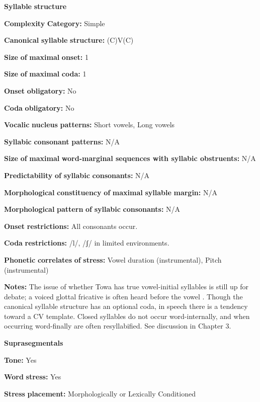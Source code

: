 \textbf{Syllable} \textbf{structure}

\textbf{Complexity} \textbf{Category:} Simple

\textbf{Canonical} \textbf{syllable} \textbf{structure:} (C)V(C) \citep[21-22]{Yumitani1998}

\textbf{Size} \textbf{of} \textbf{maximal} \textbf{onset:} 1

\textbf{Size} \textbf{of} \textbf{maximal} \textbf{coda:} 1

\textbf{Onset} \textbf{obligatory:} No

\textbf{Coda} \textbf{obligatory:} No

\textbf{Vocalic} \textbf{nucleus} \textbf{patterns:} Short vowels, Long vowels

\textbf{Syllabic} \textbf{consonant} \textbf{patterns:} N/A

\textbf{Size} \textbf{of} \textbf{maximal} \textbf{word{}-marginal sequences with syllabic obstruents:} N/A

\textbf{Predictability} \textbf{of} \textbf{syllabic} \textbf{consonants:} N/A

\textbf{Morphological} \textbf{constituency} \textbf{of} \textbf{maximal} \textbf{syllable} \textbf{margin:} N/A

\textbf{Morphological} \textbf{pattern} \textbf{of} \textbf{syllabic} \textbf{consonants:} N/A

\textbf{Onset} \textbf{restrictions:} All consonants occur.

\textbf{Coda} \textbf{restrictions:} /l/, /ʃ/ in limited environments.

\textbf{Phonetic} \textbf{correlates} \textbf{of} \textbf{stress:} Vowel duration (instrumental), Pitch (instrumental)

\textbf{Notes:} The issue of whether Towa has true vowel-initial syllables is still up for debate; a voiced glottal fricative is often heard before the vowel \citep[22-23]{Yumitani1998}. Though the canonical syllable structure has an optional coda, in speech there is a tendency toward a CV template. Closed syllables do not occur word-internally, and when occurring word-finally are often resyllabified. See discussion in Chapter 3.

\textbf{Suprasegmentals}

\textbf{Tone:} Yes

\textbf{Word} \textbf{stress:} Yes

\textbf{Stress} \textbf{placement:} Morphologically or Lexically Conditioned

